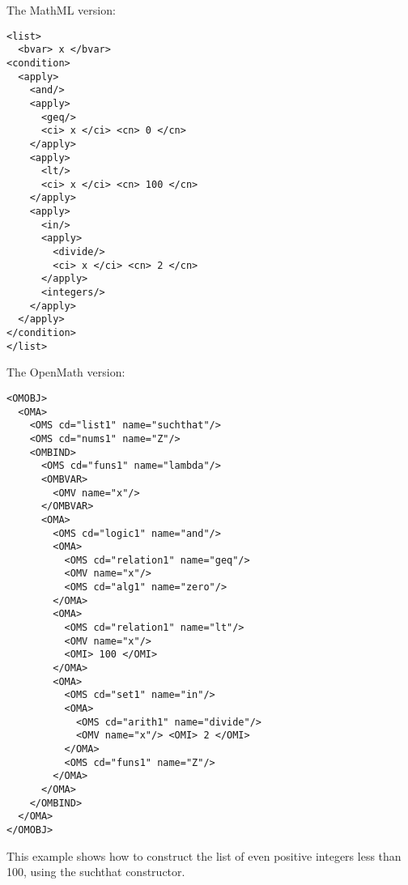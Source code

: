 \documentclass[twoside,11pt]{article}
\begin{document}
\begin{center}
\begin{myboxbopen}{4.5in}
The MathML version:
\begin{verbatim}
<list>
  <bvar> x </bvar>
<condition>
  <apply>
    <and/>
    <apply>
      <geq/>
      <ci> x </ci> <cn> 0 </cn>
    </apply>
    <apply>
      <lt/>
      <ci> x </ci> <cn> 100 </cn>
    </apply>
    <apply>
      <in/>
      <apply>
        <divide/>
        <ci> x </ci> <cn> 2 </cn>
      </apply>
      <integers/>
    </apply>
  </apply>
</condition>
</list>
\end{verbatim}

\end{myboxbopen}
\end{center}
\begin{center}
\begin{myboxtopen}{4.5in}
The OpenMath version:
\begin{verbatim}
<OMOBJ>
  <OMA>
    <OMS cd="list1" name="suchthat"/>
    <OMS cd="nums1" name="Z"/>
    <OMBIND>
      <OMS cd="funs1" name="lambda"/>
      <OMBVAR>
        <OMV name="x"/>
      </OMBVAR>
      <OMA>
        <OMS cd="logic1" name="and"/>
        <OMA>
          <OMS cd="relation1" name="geq"/>
          <OMV name="x"/>
          <OMS cd="alg1" name="zero"/>
        </OMA>
        <OMA>
          <OMS cd="relation1" name="lt"/>
          <OMV name="x"/>
          <OMI> 100 </OMI>
        </OMA>
        <OMA>
          <OMS cd="set1" name="in"/>
          <OMA>
            <OMS cd="arith1" name="divide"/>
            <OMV name="x"/> <OMI> 2 </OMI>
          </OMA>
          <OMS cd="funs1" name="Z"/>
        </OMA>
      </OMA>
    </OMBIND>
  </OMA>
</OMOBJ>
\end{verbatim}
\end{myboxtopen}
\end{center}
\begin{center}
This example shows how to construct the list of even positive integers less
than 100, using the suchthat constructor.
\end{center}
\begin{equation}\label{list-condition}
\end{equation}
\end{document}
